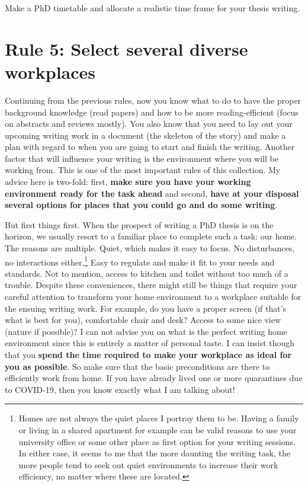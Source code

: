 \documentclass[
  12pt,
  oneside]{book}
\begin{document}
Make a PhD timetable and allocate a realistic time frame for your thesis writing.

\hypertarget{rule5}{%
\section*{\texorpdfstring{\textbf{Rule 5:} Select several diverse workplaces}{Rule 5: Select several diverse workplaces}}\label{rule5}}

Continuing from the previous rules, now you know what to do to have the proper background knowledge (read papers) and how to be more reading-efficient (focus on abstracts and reviews mostly).
You also know that you need to lay out your upcoming writing work in a document (the skeleton of the story) and make a plan with regard to when you are going to start and finish the writing.
Another factor that will influence your writing is the environment where you will be working from.
This is one of the most important rules of this collection.
My advice here is two-fold: first, \textbf{make sure you have your working environment ready for the task ahead} and second, \textbf{have at your disposal several options for places that you could go and do some writing}.

But first things first.
When the prospect of writing a PhD thesis is on the horizon, we usually resort to a familiar place to complete such a task: our home.
The reasons are multiple.
Quiet, which makes it easy to focus.
No disturbances, no interactions either.\footnote{Homes are not always the quiet places I portray them to be. Having a family or living in a shared apartment for example can be valid reasons to use your university office or some other place as first option for your writing sessions. In either case, it seems to me that the more daunting the writing task, the more people tend to seek out quiet environments to increase their work efficiency, no matter where these are located.}
Easy to regulate and make it fit to your needs and standards.
Not to mention, access to kitchen and toilet without too much of a trouble.
Despite these conveniences, there might still be things that require your careful attention to transform your home environment to a workplace suitable for the ensuing writing work.
For example, do you have a proper screen (if that's what is best for you), comfortable chair and desk?
Access to some nice view (nature if possible)?
I can not advise you on what is the perfect writing home environment since this is entirely a matter of personal taste.
I can insist though that you \textbf{spend the time required to make your workplace as ideal for you as possible}.
So make sure that the basic preconditions are there to efficiently work from home.
If you have already lived one or more quarantines due to COVID-19, then you know exactly what I am talking about!
\end{document}

